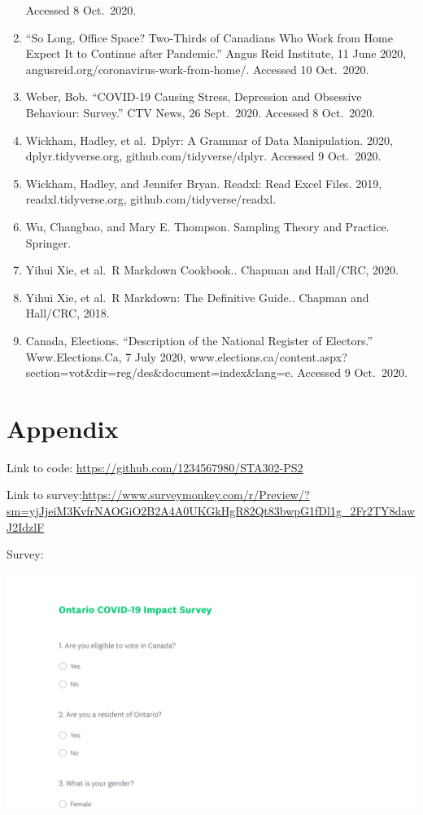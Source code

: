 \documentclass[
]{article}
\begin{document}
\begin{enumerate}
  Accessed 8 Oct.~2020.
\item
  ``So Long, Office Space? Two-Thirds of Canadians Who Work from Home
  Expect It to Continue after Pandemic.'' Angus Reid Institute, 11 June
  2020, angusreid.org/coronavirus-work-from-home/. Accessed 10
  Oct.~2020.
\item
  Weber, Bob. ``COVID-19 Causing Stress, Depression and Obsessive
  Behaviour: Survey.'' CTV News, 26 Sept.~2020. Accessed 8 Oct.~2020.
\item
  Wickham, Hadley, et al.~Dplyr: A Grammar of Data Manipulation. 2020,
  dplyr.tidyverse.org, github.com/tidyverse/dplyr. Accessed 9 Oct.~2020.
\item
  Wickham, Hadley, and Jennifer Bryan. Readxl: Read Excel Files. 2019,
  readxl.tidyverse.org, github.com/tidyverse/readxl.
\item
  Wu, Changbao, and Mary E. Thompson. Sampling Theory and Practice.
  Springer.
\item
  Yihui Xie, et al.~R Markdown Cookbook.. Chapman and Hall/CRC, 2020.
\item
  Yihui Xie, et al.~R Markdown: The Definitive Guide.. Chapman and
  Hall/CRC, 2018.
\item
  Canada, Elections. ``Description of the National Register of
  Electors.'' Www.Elections.Ca, 7 July 2020,
  www.elections.ca/content.aspx?section=vot\&dir=reg/des\&document=index\&lang=e.
  Accessed 9 Oct.~2020.
\end{enumerate}

\newpage

\hypertarget{appendix}{%
\section{Appendix}\label{appendix}}

Link to code: \url{https://github.com/1234567980/STA302-PS2}

Link to
survey:\url{https://www.surveymonkey.com/r/Preview/?sm=yjJjeiM3KvfrNAOGiO2B2A4A0UKGkHgR82Qt83bwpG1fDl1g_2Fr2TY8dawJ2IdzlF}

Survey:

\includegraphics{./survey image/1.1.png}
\end{document}
